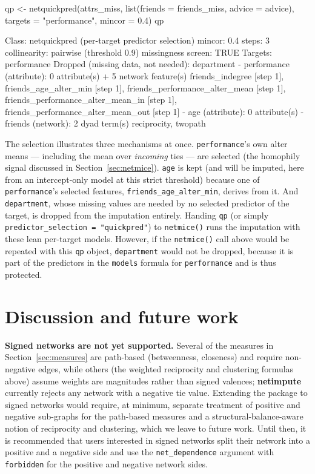 \documentclass[11pt,a4paper]{article}
\newcommand{\pkg}[1]{\textbf{#1}}
\newcommand{\code}[1]{\texttt{#1}}
\begin{document}
\begin{Rinput}
qp <- netquickpred(attrs_miss,
                   list(friends = friends_miss, advice = advice),
                   targets = "performance", mincor = 0.4)
qp
\end{Rinput}

\begin{Routput}
Class: netquickpred (per-target predictor selection)
mincor: 0.4  steps: 3  collinearity: pairwise (threshold 0.9)
missingness screen: TRUE
Targets: performance
Dropped (missing data, not needed): department
- performance (attribute): 0 attribute(s) + 5 network feature(s)
    friends_indegree [step 1], friends_age_alter_min [step 1],
    friends_performance_alter_mean [step 1],
    friends_performance_alter_mean_in [step 1],
    friends_performance_alter_mean_out [step 1]
- age (attribute): 0 attribute(s)
- friends (network): 2 dyad term(s)
    reciprocity, twopath
\end{Routput}

The selection illustrates three mechanisms at once. \code{performance}'s
own alter means --- including the mean over \emph{incoming} ties --- are
selected (the homophily signal discussed in
Section~\ref{sec:netmice}). \code{age} is kept (and will be imputed, here
from an intercept-only model at this strict threshold) because one of
\code{performance}'s selected features, \code{friends\_age\_alter\_min},
derives from it. And \code{department}, whose missing values are needed by
no selected predictor of the target, is dropped from the imputation
entirely. Handing \code{qp} (or simply \code{predictor\_selection =
"quickpred"}) to \code{netmice()} runs the imputation with these lean
per-target models. However, if the \code{netmice()} call above would be repeated
with this \code{qp} object, \code{department} would not be dropped, because it
is part of the predictors in the \code{models} formula for \code{performance}
and is thus protected.

\section{Discussion and future work}
\label{sec:discussion}

\textbf{Signed networks are not yet supported.} Several of the measures in
Section~\ref{sec:measures} are path-based (betweenness, closeness) and
require non-negative edges, while others (the weighted reciprocity and
clustering formulas above) assume weights are magnitudes rather than
signed valences; \pkg{netimpute} currently rejects any network with a
negative tie value. Extending the package to signed networks would
require, at minimum, separate treatment of positive and negative sub-graphs
for the path-based measures and a structural-balance-aware notion of
reciprocity and clustering, which we leave to future work. Until then, it is
recommended that users interested in signed networks split their network into a
positive and a negative side and use the \code{net\_dependence} argument  with
\code{forbidden} for the positive and negative network sides.
\end{document}
